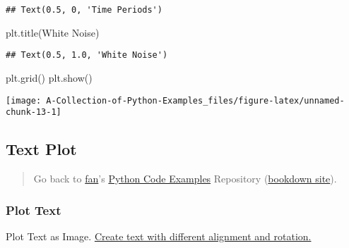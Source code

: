 \documentclass[
]{book}
\newenvironment{Shaded}{\begin{snugshade}}{\end{snugshade}}
\newcommand{\NormalTok}[1]{#1}
\newcommand{\StringTok}[1]{\textcolor[rgb]{0.31,0.60,0.02}{#1}}
\begin{document}
\begin{verbatim}
## Text(0.5, 0, 'Time Periods')
\end{verbatim}

\begin{Shaded}
\begin{Highlighting}[]
\NormalTok{plt.title(}\StringTok{\textquotesingle{}White Noise\textquotesingle{}}\NormalTok{)}
\end{Highlighting}
\end{Shaded}

\begin{verbatim}
## Text(0.5, 1.0, 'White Noise')
\end{verbatim}

\begin{Shaded}
\begin{Highlighting}[]
\NormalTok{plt.grid()}
\NormalTok{plt.show()}
\end{Highlighting}
\end{Shaded}

\begin{center}\texttt{[image: A-Collection-of-Python-Examples\_files/figure-latex/unnamed-chunk-13-1]} \end{center}

\hypertarget{text-plot}{%
\subsection{Text Plot}\label{text-plot}}

\begin{quote}
Go back to \href{http://fanwangecon.github.io/}{fan}'s \href{https://fanwangecon.github.io/pyfan/}{Python Code Examples} Repository (\href{https://fanwangecon.github.io/pyfan/bookdown}{bookdown site}).
\end{quote}

\hypertarget{plot-text}{%
\subsubsection{Plot Text}\label{plot-text}}

Plot Text as Image. \href{https://matplotlib.org/3.1.1/gallery/pyplots/text_layout.html\#sphx-glr-gallery-pyplots-text-layout-py}{Create text with different alignment and rotation.}
\end{document}
